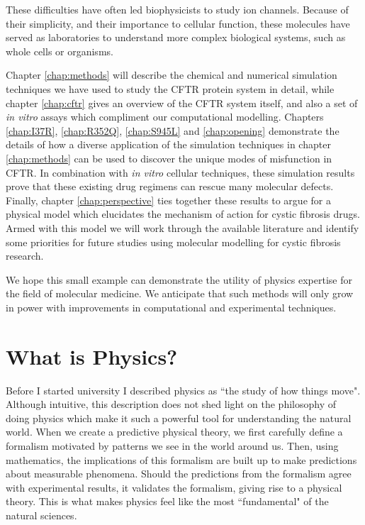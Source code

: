 These difficulties have often led biophysicists to study ion channels. Because of their simplicity, and their importance to cellular function, these molecules have served as laboratories to understand more complex biological systems, such as whole cells or organisms. 

Chapter \ref{chap:methods} will describe the chemical and numerical simulation techniques we have used to study the CFTR protein system in detail, while chapter \ref{chap:cftr} gives an overview of the CFTR system itself, and also a set of \textit {in vitro} assays which compliment our computational modelling.  Chapters \ref{chap:I37R}, \ref{chap:R352Q}, \ref{chap:S945L} and \ref{chap:opening} demonstrate the details of how a diverse application of the simulation techniques in chapter \ref{chap:methods} can be used to discover the unique modes of misfunction in CFTR. In combination with \textit {in vitro} cellular techniques, these simulation results prove that these existing drug regimens can rescue many molecular defects. Finally, chapter \ref{chap:perspective} ties together these results to argue for a physical model which elucidates the mechanism of action for cystic fibrosis drugs. Armed with this model we will work through the available literature and identify some priorities for future studies using molecular modelling for cystic fibrosis research. 


We hope this small example can demonstrate the utility of physics expertise for the field of molecular medicine. We anticipate that such methods will only grow in power with improvements in computational and experimental techniques.

\section{What is Physics?}
\label{WIP}
Before I started university I described physics as ``the study of how things move". Although intuitive, this description does not shed light on the philosophy of doing physics which make it such a powerful tool for understanding the natural world. When we create a predictive physical theory, we first carefully define a formalism motivated by patterns we see in the world around us. Then, using mathematics, the implications of this formalism are built up to make predictions about measurable phenomena. Should the predictions from the formalism agree with experimental results, it validates the formalism, giving rise to a physical theory. This is what makes physics feel like the most ``fundamental" of the natural sciences.

